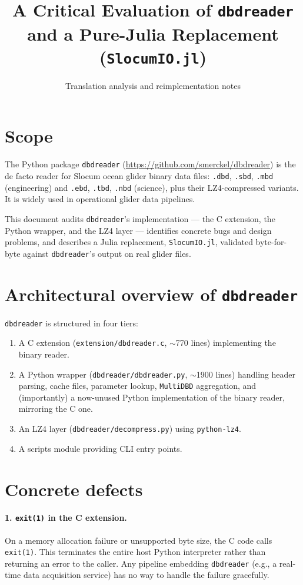 \documentclass[11pt]{article}
\title{A Critical Evaluation of \texttt{dbdreader} \\
       \large and a Pure-Julia Replacement (\texttt{SlocumIO.jl})}
\author{Translation analysis and reimplementation notes}
\date{}
\begin{document}
\maketitle

\section{Scope}

The Python package \texttt{dbdreader}
(\url{https://github.com/smerckel/dbdreader}) is the de facto reader for
Slocum ocean glider binary data files: \texttt{.dbd},
\texttt{.sbd}, \texttt{.mbd} (engineering) and \texttt{.ebd}, \texttt{.tbd},
\texttt{.nbd} (science), plus their LZ4-compressed variants.  It is widely
used in operational glider data pipelines.

This document audits \texttt{dbdreader}'s implementation — the C
extension, the Python wrapper, and the LZ4 layer — identifies concrete
bugs and design problems, and describes a Julia replacement,
\texttt{SlocumIO.jl}, validated byte-for-byte against \texttt{dbdreader}'s
output on real glider files.

\section{Architectural overview of \texttt{dbdreader}}

\texttt{dbdreader} is structured in four tiers:
\begin{enumerate}[leftmargin=*,topsep=1pt,itemsep=0pt]
  \item A C extension (\texttt{extension/dbdreader.c}, $\sim$770 lines)
        implementing the binary reader.
  \item A Python wrapper (\texttt{dbdreader/dbdreader.py}, $\sim$1900 lines)
        handling header parsing, cache files, parameter lookup,
        \texttt{MultiDBD} aggregation, and (importantly) a now-unused
        Python implementation of the binary reader, mirroring the C one.
  \item An LZ4 layer (\texttt{dbdreader/decompress.py}) using \texttt{python-lz4}.
  \item A scripts module providing CLI entry points.
\end{enumerate}

\section{Concrete defects}

\paragraph{1. \texttt{exit(1)} in the C extension.}
On a memory allocation failure or unsupported byte size, the C code calls
\texttt{exit(1)}.  This terminates the entire host Python interpreter
rather than returning an error to the caller.  Any pipeline embedding
\texttt{dbdreader} (e.g., a real-time data acquisition service) has no way
to handle the failure gracefully.
\end{document}

